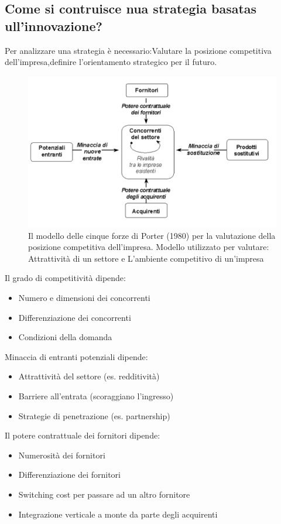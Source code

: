 \documentclass{article}
\begin{document}
\subsection{Come si contruisce nua strategia basatas ull'innovazione?}
Per analizzare una strategia è necessario:Valutare la posizione competitiva dell’impresa,definire l’orientamento strategico per il futuro.
\begin{figure}[h!]
	\centering
	\includegraphics[scale=0.4]{images/Porter.png}
	\caption{Il modello delle cinque forze di Porter (1980)
		per la valutazione della posizione competitiva
		dell’impresa. Modello
		utilizzato per
		valutare:
		Attrattività di
		un settore e
		L’ambiente
		competitivo
		di un’impresa}
	\label{fig:Porter}
\end{figure}

Il grado di competitività  dipende:
\begin{itemize}
\item Numero e dimensioni dei concorrenti
\item Differenziazione dei concorrenti
\item Condizioni della domanda
\end{itemize}
Minaccia di entranti potenziali dipende:
\begin{itemize}
	\item Attrattività del settore (es. redditività)
	\item Barriere all’entrata (scoraggiano l’ingresso)
	\item Strategie di penetrazione (es. partnership)
\end{itemize}
Il potere contrattuale dei fornitori
dipende:
\begin{itemize}
	\item Numerosità dei fornitori
	\item Differenziazione dei fornitori
	\item Switching cost per passare ad un
	altro fornitore
	\item Integrazione verticale a monte da parte degli acquirenti
\end{itemize}
\end{document}
